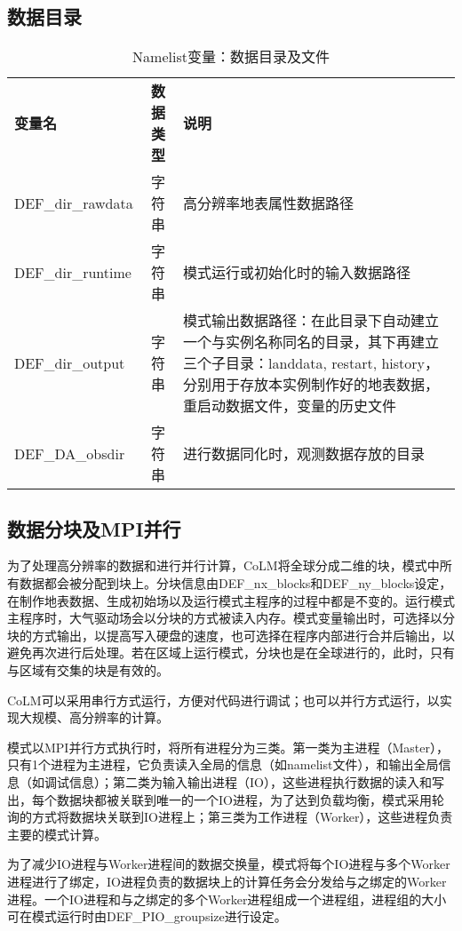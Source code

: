 \documentclass[a4paper,12pt,twoside]{article}
\begin{document}
\subsection{数据目录}
\begin{table}[!htbp]
\caption{Namelist变量：数据目录及文件} \label{table_nl_dir_file}
\centering \renewcommand{\arraystretch}{1.2}
\begin{tabular}{lcp{}}
\toprule
\textbf{变量名} & \textbf{数据类型} & \textbf{说明} \\
DEF\_dir\_rawdata & 字符串 & 高分辨率地表属性数据路径 \\
DEF\_dir\_runtime & 字符串 & 模式运行或初始化时的输入数据路径 \\
DEF\_dir\_output & 字符串 & 模式输出数据路径：在此目录下自动建立一个与实例名称同名的目录，其下再建立三个子目录：landdata, restart, history，分别用于存放本实例制作好的地表数据，重启动数据文件，变量的历史文件 \\
DEF\_DA\_obsdir & 字符串 & 进行数据同化时，观测数据存放的目录 \\
\bottomrule
\end{tabular} 
\end{table}

\subsection{数据分块及MPI并行}

为了处理高分辨率的数据和进行并行计算，CoLM将全球分成二维的块，模式中所有数据都会被分配到块上。分块信息由DEF\_nx\_blocks和DEF\_ny\_blocks设定，在制作地表数据、生成初始场以及运行模式主程序的过程中都是不变的。运行模式主程序时，大气驱动场会以分块的方式被读入内存。模式变量输出时，可选择以分块的方式输出，以提高写入硬盘的速度，也可选择在程序内部进行合并后输出，以避免再次进行后处理。若在区域上运行模式，分块也是在全球进行的，此时，只有与区域有交集的块是有效的。

CoLM可以采用串行方式运行，方便对代码进行调试；也可以并行方式运行，以实现大规模、高分辨率的计算。

模式以MPI并行方式执行时，将所有进程分为三类。第一类为主进程（Master），只有1个进程为主进程，它负责读入全局的信息（如namelist文件），和输出全局信息（如调试信息）；第二类为输入输出进程（IO），这些进程执行数据的读入和写出，每个数据块都被关联到唯一的一个IO进程，为了达到负载均衡，模式采用轮询的方式将数据块关联到IO进程上；第三类为工作进程（Worker），这些进程负责主要的模式计算。

为了减少IO进程与Worker进程间的数据交换量，模式将每个IO进程与多个Worker进程进行了绑定，IO进程负责的数据块上的计算任务会分发给与之绑定的Worker进程。一个IO进程和与之绑定的多个Worker进程组成一个进程组，进程组的大小可在模式运行时由DEF\_PIO\_groupsize进行设定。
\end{document}
